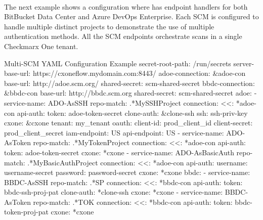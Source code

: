 \pagebreak
\noindent\\The next example shows a configuration where \cxoneflow has endpoint handlers for both
BitBucket Data Center and Azure DevOps Enterprise.  Each SCM is configured to handle multiple distinct
projects to demonstrate the use of multiple authentication methods.  All the SCM endpoints
orchestrate scans in a single Checkmarx One tenant.

\begin{code}{Multi-SCM YAML Configuration Example}{}{}
secret-root-path: /run/secrets
server-base-url: https://cxoneflow.mydomain.com:8443/
adoe-connection: &adoe-con
    base-url: http://adoe.scm.org/
    shared-secret: scm-shared-secret
bbdc-connection: &bbdc-con
    base-url: http://bbdc.scm.org
    shared-secret: scm-shared-secret
adoe:
    - service-name: ADO-AsSSH
        repo-match: .*MySSHProject
        connection:
        <<: *adoe-con
        api-auth: 
            token: adoe-token-secret
        clone-auth: &clone-ssh
            ssh: ssh-priv-key
        cxone: &cxone
        tenant: my_tenant
        oauth:
            client-id: prod_client_id
            client-secret: prod_client_secret
        iam-endpoint: US
        api-endpoint: US
    - service-name: ADO-AsToken
        repo-match: .*MyTokenProject
        connection:
        <<: *adoe-con
        api-auth:
            token: adoe-token-secret
        cxone: *cxone
    - service-name: ADO-AsBasicAuth
        repo-match: .*MyBasicAuthProject
        connection:
        <<: *adoe-con
        api-auth:
            username: username-secret
            password: password-secret
        cxone: *cxone
bbdc:
    - service-name: BBDC-AsSSH
        repo-match: .*SP
        connection:
        <<: *bbdc-con
        api-auth: 
            token: bbdc-ssh-proj-pat
        clone-auth: *clone-ssh
        cxone: *cxone
    - service-name: BBDC-AsToken
        repo-match: .*TOK
        connection:
        <<: *bbdc-con
        api-auth:
            token: bbdc-token-proj-pat
        cxone: *cxone
\end{code}
